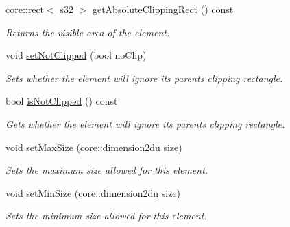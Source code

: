 \begin{DoxyCompactItemize}
\hyperlink{classirr_1_1core_1_1rect}{core\+::rect}$<$ \hyperlink{namespaceirr_ac66849b7a6ed16e30ebede579f9b47c6}{s32} $>$ \hyperlink{classirr_1_1gui_1_1IGUIElement_ad06166ccb3e9c86f17bd2a6cfc627eba}{get\+Absolute\+Clipping\+Rect} () const
\begin{DoxyCompactList}\small\item\em Returns the visible area of the element. \end{DoxyCompactList}\item 
void \hyperlink{classirr_1_1gui_1_1IGUIElement_a814d322989acafa74c895e5c13908b86}{set\+Not\+Clipped} (bool no\+Clip)
\begin{DoxyCompactList}\small\item\em Sets whether the element will ignore its parent\textquotesingle{}s clipping rectangle. \end{DoxyCompactList}\item 
bool \hyperlink{classirr_1_1gui_1_1IGUIElement_a940fcf886f9ae1e4bc719e19057018a2}{is\+Not\+Clipped} () const
\begin{DoxyCompactList}\small\item\em Gets whether the element will ignore its parent\textquotesingle{}s clipping rectangle. \end{DoxyCompactList}\item 
void \hyperlink{classirr_1_1gui_1_1IGUIElement_ae80ad7253fb9fb2ebbeda2a8148fff3e}{set\+Max\+Size} (\hyperlink{namespaceirr_1_1core_ad2e562e3219072e2f7fc7c2bba0ef0cb}{core\+::dimension2du} size)
\begin{DoxyCompactList}\small\item\em Sets the maximum size allowed for this element. \end{DoxyCompactList}\item 
\mbox{\label{classirr_1_1gui_1_1IGUIElement_ae1ddcdd58af93fea900bd6295d4d8e61}} 
void \hyperlink{classirr_1_1gui_1_1IGUIElement_ae1ddcdd58af93fea900bd6295d4d8e61}{set\+Min\+Size} (\hyperlink{namespaceirr_1_1core_ad2e562e3219072e2f7fc7c2bba0ef0cb}{core\+::dimension2du} size)
\begin{DoxyCompactList}\small\item\em Sets the minimum size allowed for this element. \end{DoxyCompactList}\item 
\mbox{\label{classirr_1_1gui_1_1IGUIElement_a1eb3d7ec13ebbf8c73859810088f666b}} 

\end{DoxyCompactItemize}
